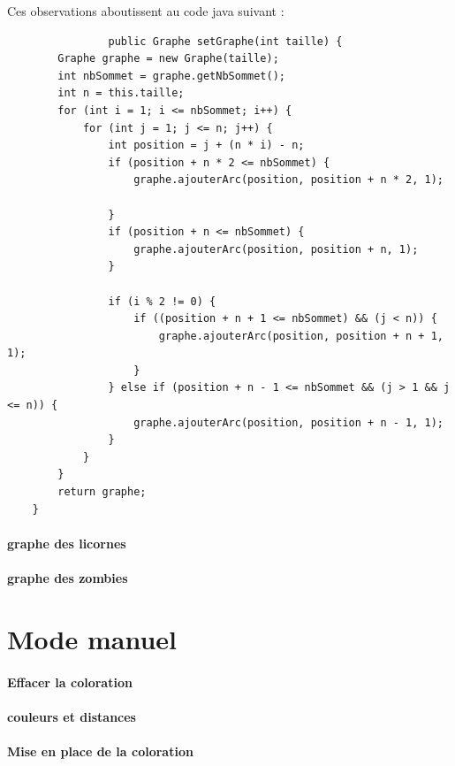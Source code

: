 \documentclass{report}
\begin{document}
			Ces observations aboutissent au code java suivant : 
			\\
			\begin{verbatim}
				public Graphe setGraphe(int taille) {
        Graphe graphe = new Graphe(taille);
        int nbSommet = graphe.getNbSommet();
        int n = this.taille;
        for (int i = 1; i <= nbSommet; i++) { 
            for (int j = 1; j <= n; j++) { 
                int position = j + (n * i) - n;
                if (position + n * 2 <= nbSommet) { 
                    graphe.ajouterArc(position, position + n * 2, 1);

                }
                if (position + n <= nbSommet) {
                    graphe.ajouterArc(position, position + n, 1);
                }

                if (i % 2 != 0) {    
                    if ((position + n + 1 <= nbSommet) && (j < n)) { 
                        graphe.ajouterArc(position, position + n + 1, 1);
                    }
                } else if (position + n - 1 <= nbSommet && (j > 1 && j <= n)) {
                    graphe.ajouterArc(position, position + n - 1, 1);
                }
            }
        }
        return graphe;
    }
			\end{verbatim}
								
			
			
			
			
			
			
			
			
			\paragraph{graphe des licornes}
			\paragraph{graphe des zombies}
		\section{Mode manuel}
			\paragraph{Effacer la coloration}
			\paragraph{couleurs et distances}
			\paragraph{Mise en place de la coloration}
			
\end{document}
